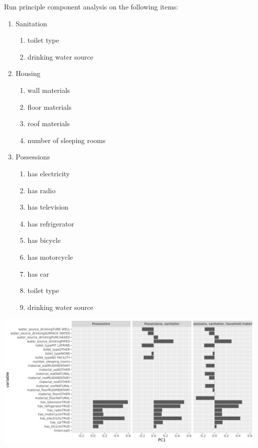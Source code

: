 \documentclass[aspectratio=169]{beamer}
\begin{document}
\begin{frame}

Run principle component analysis on the following items:

\begin{enumerate}
	\item Sanitation
    \begin{enumerate}
        \item toilet type
        \item drinking water source
    \end{enumerate}
  \item Housing
    \begin{enumerate}
        \item wall materials
        \item floor materials
        \item roof materials
        \item number of sleeping rooms
    \end{enumerate}
  \item Possessions
    \begin{enumerate}
        \item has electricity
        \item has radio
        \item has television
        \item has refrigerator
        \item has bicycle
        \item has motorcycle
        \item has car
        \item toilet type
        \item drinking water source
    \end{enumerate}
\end{enumerate}
\end{frame}

\begin{frame}
\includegraphics[width=\textwidth]{../res/PCA_loadings.png}
\end{frame}
\end{document}

